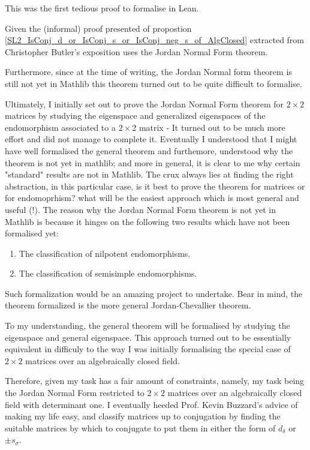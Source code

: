 \begin{remark}

This was the first tedious proof to formalise in Lean.

Given the (informal) proof presented of propostion \ref{SL2_IsConj_d_or_IsConj_s_or_IsConj_neg_s_of_AlgClosed} extracted from Christopher Butler's exposition uses the Jordan Normal Form theorem. 

Furthermore, since at the time of writing, the Jordan Normal form theorem is still not yet in Mathlib this theorem turned out to be quite difficult to formalise.

Ultimately, I initially set out to prove the Jordan Normal Form theorem for $2 \times 2$ matrices by studying the eigenspace and generalized eigenspaces of the endomorphism associated to a $2 \times 2$ matrix - It turned out to be much more effort and did not manage to complete it. 
Eventually I understood that I might have well formalised the general theorem and furthemore, understood why the theorem is not yet in mathlib; and more in general, it is clear to me why certain "standard" results are not in Mathlib. 
The crux always lies at finding the right abstraction, in this particular case, is it best to prove the theorem for matrices or for endomoprhism? what will be the easiest approach which is most general and useful (!).
The reason why the Jordan Normal Form theorem is not yet in Mathlib is because it hinges on the following two results which have not been formalised yet:

\begin{enumerate}
    \item The classification of nilpotent endomorphisms.
    \item The classification of semisimple endomorphisms.
\end{enumerate}

Such formalization would be an amazing project to undertake. Bear in mind, the theorem formalized is the more general Jordan-Chevallier theorem.

To my understanding, the general theorem will be formalised by studying the eigenspace and general eigenspace. This approach turned out to be essentially equivalent in difficuly to the way I was initially formalising the special case of $2 \times 2$ matrices over an algebraically closed field.

Therefore, given my task has a fair amount of constraints, namely, my task being the Jordan Normal Form restricted to $2 \times 2$ matrices over an algebraically closed field with determinant one. I eventually heeded Prof. Kevin Buzzard's advice of making my life easy, and classify matrices up to conjugation 
by finding the suitable matrices by which to conjugate to put them in either the form of $d_\delta$ or $\pm s_\sigma$.
\end{remark}

